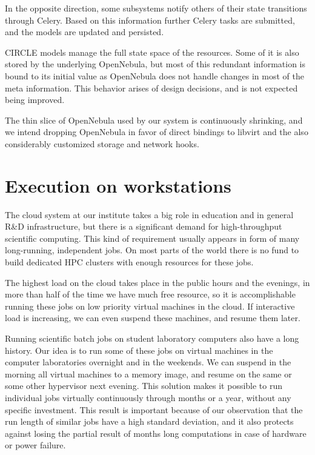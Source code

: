 \documentclass{llncs}
\begin{document}
In the opposite direction, some subsystems notify others of their state transitions through Celery. Based on this information further Celery tasks are submitted, and the models are updated and persisted.

CIRCLE models manage the full state space of the resources. Some of it is also stored by the underlying OpenNebula, but most of this redundant information is bound to its initial value as OpenNebula does not handle changes in most of the meta information. This behavior arises of design decisions, and is not expected being improved.

The thin slice of OpenNebula used by our system is continuously shrinking, and we intend dropping OpenNebula in favor of direct bindings to libvirt and the also considerably customized storage and network hooks.

\section{Execution on workstations}
The cloud system at our institute takes a big role in education and in general R{\&}D infrastructure, but there is a significant demand for high-throughput scientific computing. This  kind of requirement usually appears in form of many long-running, independent jobs. On most parts of the world there is no fund to build dedicated HPC clusters with enough resources for these jobs.

The highest load on the cloud takes place in the public hours and the evenings, in more than half of the time we have much free resource, so it is accomplishable running these jobs on low priority virtual machines in the cloud. If interactive load is increasing, we can even suspend these machines, and resume them later.

Running scientific batch jobs on student laboratory computers also have a long history. Our idea is to run some of these jobs on virtual machines in the computer laboratories overnight and in the weekends. We can suspend in the morning all virtual machines to a memory image, and resume on the same or some other hypervisor next evening. This solution makes it possible to run individual jobs virtually continuously through months or a year, without any specific investment. This result is important because of our observation that the run length of similar jobs have a high standard deviation, and it also protects against losing the partial result of months long computations in case of hardware or power failure.
\end{document}
